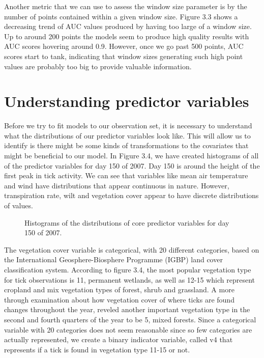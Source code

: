 \noindent Another metric that we can use to assess the window size parameter is by the number of points contained within a given window size. Figure 3.3 shows a decreasing trend of AUC values produced by having too large of a window size. Up to around 200 points the models seem to produce high quality results with AUC scores hovering around 0.9. However, once we go past 500 points, AUC scores start to tank, indicating that window sizes generating such high point values are probably too big to provide valuable information.  \newline



\section{Understanding predictor variables}

Before we try to fit models to our observation set, it is necessary to understand what the distributions of our predictor variables look like. This will allow us to identify is there might be some kinds of transformations to the covariates that might be beneficial to our model. In Figure 3.4, we have created histograms of all of the predictor variables for day 150 of 2007. Day 150 is around the height of the first peak in tick activity. We can see that variables like mean air temperature and wind have distributions that appear continuous in nature. However, transpiration rate, wilt and vegetation cover appear to have discrete distributions of values. \newline

\begin{figure} [!ht]
\centerline{}
\caption{Histograms of the distributions of core predictor  variables for day 150 of 2007. }
\label{fig6}
\end{figure}

\noindent The vegetation cover variable is categorical, with 20 different categories, based on the International Geosphere-Biosphere Programme (IGBP) land cover classification system. According to figure 3.4, the most popular vegetation type for tick observations is 11, permanent wetlands, as well as 12-15 which represent cropland and mix vegetation types of forest, shrub and grassland. A more through examination about how vegetation cover of where ticks are found changes throughout the year, reveled another important vegetation type in the second and fourth quarters of the year to be 5, mixed forests. Since a categorical variable with 20 categories does not seem reasonable since so few categories are actually represented, we create a binary indicator variable, called v4 that represents if a tick is found in vegetation type 11-15 or not. 


